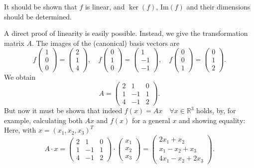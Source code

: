 It should be shown that \(f\) is linear, and \(\ker(f)\), \(\text{Im}(f)\) and their dimensions should be determined.

A direct proof of linearity is easily possible. Instead, we give the transformation matrix \(A\). The images of the (canonical) basis vectors are
\[
f\begin{pmatrix}
1 \\
0 \\
0
\end{pmatrix} =
\begin{pmatrix}
2 \\
1 \\
4
\end{pmatrix} , \quad
f\begin{pmatrix}
0 \\
1 \\
0
\end{pmatrix} =
\begin{pmatrix}
1 \\
-1 \\
-1
\end{pmatrix} , \quad
f\begin{pmatrix}
0 \\
0 \\
1
\end{pmatrix} =
\begin{pmatrix}
0 \\
1 \\
2
\end{pmatrix} .
\]
We obtain
\[
A =
\begin{pmatrix}
2 & 1 & 0 \\
1 & -1 & 1 \\
4 & -1 & 2
\end{pmatrix} .
\]
But now it must be shown that indeed \(f(x) = Ax \quad \forall x \in \mathbb{R}^3\) holds, by, 
for example, calculating both \(Ax\) and \(f(x)\) for a 
general \(x\) and showing equality: Here, with \(x = (x_1, x_2, x_3)^T\)
\[
A \cdot x =
\begin{pmatrix}
2 & 1 & 0 \\
1 & -1 & 1 \\
4 & -1 & 2
\end{pmatrix}
\cdot
\begin{pmatrix}
x_1 \\
x_2 \\
x_3
\end{pmatrix} =
\begin{pmatrix}
2x_1 + x_2 \\
x_1 - x_2 + x_3 \\
4x_1 - x_2 + 2x_3
\end{pmatrix} .
\]
